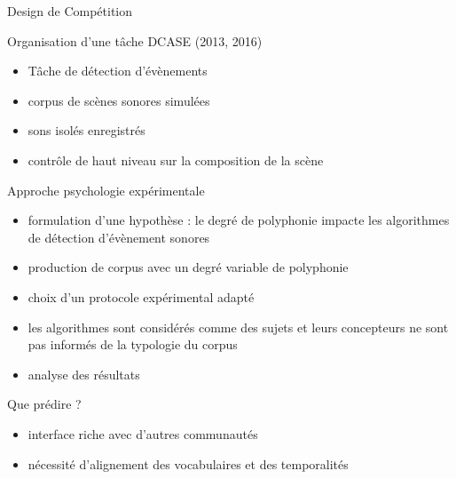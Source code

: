 \begin{frame}{Design de Compétition}
\begin{block}{Organisation d'une tâche DCASE (2013, 2016)}
\begin{itemize}
\item Tâche de détection d'évènements
\item corpus de scènes sonores simulées
\item sons isolés enregistrés
\item contrôle de haut niveau sur la composition de la scène
\end{itemize}
\end{block} 
\end{frame}

\begin{frame}{Approche  \og psychologie expérimentale \fg}
\begin{itemize}
\item formulation d'une hypothèse : le degré de polyphonie impacte les algorithmes de détection d'évènement sonores
\item production de corpus avec un degré variable de polyphonie
\item choix d'un protocole expérimental adapté
\item les algorithmes sont considérés comme des sujets et leurs concepteurs ne sont pas informés de la typologie du corpus
\item analyse des résultats
\end{itemize} 
\end{frame}

\begin{frame}{Que prédire ?}
\begin{center}
\end{center}
\vspace{.8cm}
\begin{itemize}
\item interface riche avec d'autres communautés
\item nécessité d'alignement des vocabulaires et des temporalités
\end{itemize}
\end{frame}

